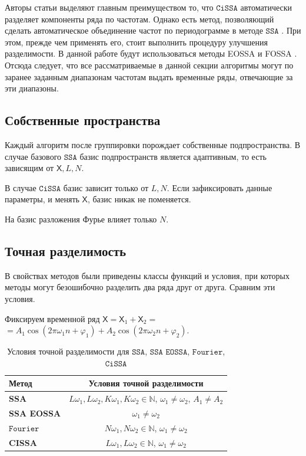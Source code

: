 \documentclass[12pt, specialist, subf
]{disser}
\theoremstyle{definition}
\newcommand{\SSA}{\texttt{SSA}}
\newcommand{\EOSSA}{\texttt{SSA EOSSA}}
\newcommand{\CISSA}{\texttt{CiSSA}}
\newcommand{\FOURIER}{\texttt{Fourier}}
\newcommand{\TS}{\mathsf{X}}
\begin{document}
\label{subsubsec:autogroup}

Авторы статьи \cite{bogalo2020} выделяют главным преимуществом то, что $\CISSA$ автоматически разделяет компоненты ряда по частотам. Однако есть метод, позволяющий сделать автоматическое объединение частот по периодограмме в методе $\SSA$
\cite{golyandina2023automatedidentificationsingularspectrum}
. При этом, прежде чем применять его, стоит выполнить процедуру улучшения разделимости. В данной работе будут использоваться методы EOSSA и FOSSA \cite{golyandina2023intelligent}. Отсюда следует, что все рассматриваемые в данной секции алгоритмы могут по заранее заданным диапазонам частотам выдать временные ряды, отвечающие за эти диапазоны.



\subsection{Собственные пространства}
Каждый алгоритм после группировки порождает собственные подпространства. В случае базового $\SSA$ базис подпространств является адаптивным, то есть зависящим от $\TS, L, N$.

В случае $\CISSA$ базис зависит только от $L, N$. Если зафиксировать данные параметры, и менять $\TS$, базис никак не поменяется.

На базис разложения Фурье влияет только $N$.


\subsection{Точная разделимость}
\label{subsubsec:exact}

В свойствах методов были приведены классы функций и условия, при которых методы могут безошибочно разделить два ряда друг от друга. Сравним эти условия.


Фиксируем временной ряд $\TS = \TS_{1} + \TS_{2} =$ $= A_1 \cos(2\pi \omega_1 n + \varphi_1) + A_2 \cos(2\pi \omega_2 n + \varphi_2)$.

\begin{table}[H]
    \centering
    \caption{Условия точной разделимости для $\SSA$, $\EOSSA$, $\FOURIER$, $\CISSA$}
    \label{tab:separability_conditions}
    \begin{tabular}{l|c}
        \hline
        \textbf{Метод}     & \textbf{Условия точной разделимости} \\
        \hline
        \textbf{SSA}       & $L\omega_1, L\omega_2, K\omega_1, K\omega_2 \in \mathbb{N}$, $\omega_1 \ne \omega_2$, $A_1 \ne A_2$ \\
        \textbf{SSA EOSSA} & $\omega_1 \ne \omega_2$ \\
        $\FOURIER$     & $N\omega_1, N\omega_2 \in \mathbb{N}$, $\omega_1 \ne \omega_2$ \\
        \textbf{CISSA}     & $L\omega_1, L\omega_2 \in \mathbb{N}$, $\omega_1 \ne \omega_2$ \\
        \hline
    \end{tabular}
\end{table}
\end{document}
